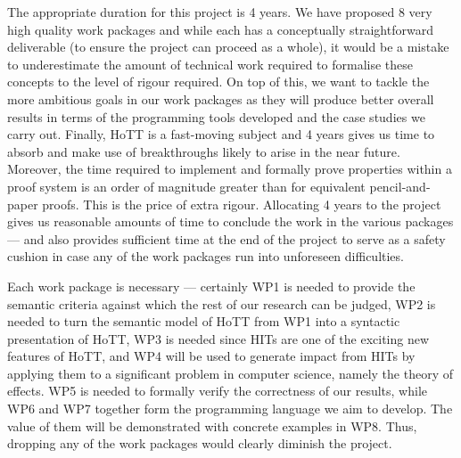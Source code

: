 \documentclass[a4paper,11pt]{article}
\begin{document}
 The appropriate duration for
this project is 4 years. We have proposed 8 very high quality work
packages and while each has a conceptually straightforward deliverable
(to ensure the project can proceed as a whole), it would be a mistake
to underestimate the amount of technical work required to formalise
these concepts to the level of rigour required. On top of this, we
want to tackle the more ambitious goals in our work packages as they
will produce better overall results in terms of the programming tools
developed and the case studies we carry out. Finally, HoTT is a
fast-moving subject and 4 years gives us time to absorb and make use
of breakthroughs likely to arise in the near future.  Moreover, the
time required to implement and formally prove properties within a
proof system is an order of magnitude greater than for equivalent
pencil-and-paper proofs. This is the price of extra rigour. Allocating
4 years to the project gives us reasonable amounts of time to conclude
the work in the various packages --- and also provides sufficient time
at the end of the project to serve as a safety cushion in case any of
the work packages run into unforeseen difficulties.


\noindent Each work package is necessary --- certainly WP1 is needed
to provide the semantic criteria against which the rest of our
research can be judged, WP2 is needed to turn the semantic model of
HoTT from WP1 into a syntactic presentation of HoTT, WP3 is needed
since HITs are one of the exciting new features of HoTT, and WP4 will
be used to generate impact from HITs by applying them to a significant
problem in computer science, namely the theory of effects. WP5 is
needed to formally verify the correctness of our results, while WP6
and WP7 together form the programming language we aim to develop. The
value of them will be demonstrated with concrete examples in WP8.
Thus, dropping any of the work packages would clearly diminish the
project.

\vspace{0.02in}
\end{document}
